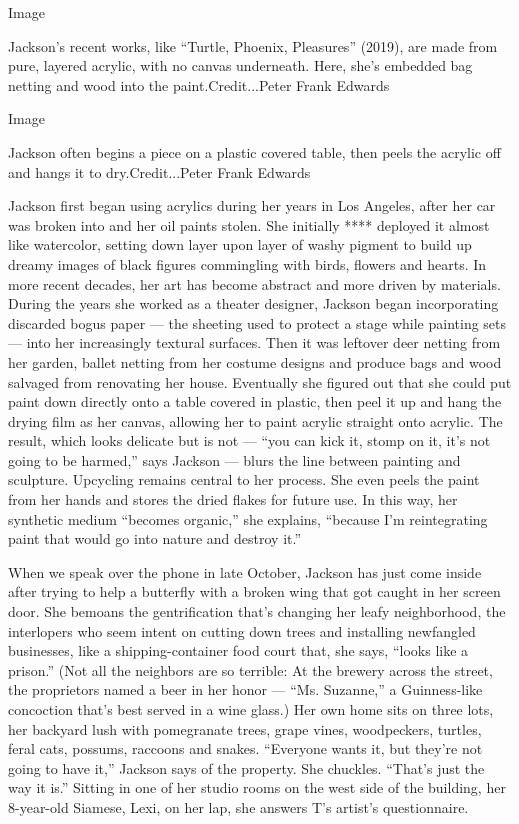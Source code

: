 Image

Jackson's recent works, like ``Turtle, Phoenix, Pleasures'' (2019), are
made from pure, layered acrylic, with no canvas underneath. Here, she's
embedded bag netting and wood into the paint.Credit...Peter Frank
Edwards

Image

Jackson often begins a piece on a plastic covered table, then peels the
acrylic off and hangs it to dry.Credit...Peter Frank Edwards

Jackson first began using acrylics during her years in Los Angeles,
after her car was broken into and her oil paints stolen. She initially
**** deployed it almost like watercolor, setting down layer upon layer
of washy pigment to build up dreamy images of black figures commingling
with birds, flowers and hearts. In more recent decades, her art has
become abstract and more driven by materials. During the years she
worked as a theater designer, Jackson began incorporating discarded
bogus paper --- the sheeting used to protect a stage while painting sets
--- into her increasingly textural surfaces. Then it was leftover deer
netting from her garden, ballet netting from her costume designs and
produce bags and wood salvaged from renovating her house. Eventually she
figured out that she could put paint down directly onto a table covered
in plastic, then peel it up and hang the drying film as her canvas,
allowing her to paint acrylic straight onto acrylic. The result, which
looks delicate but is not --- ``you can kick it, stomp on it, it's not
going to be harmed,'' says Jackson --- blurs the line between painting
and sculpture. Upcycling remains central to her process. She even peels
the paint from her hands and stores the dried flakes for future use. In
this way, her synthetic medium ``becomes organic,'' she explains,
``because I'm reintegrating paint that would go into nature and destroy
it.''

When we speak over the phone in late October, Jackson has just come
inside after trying to help a butterfly with a broken wing that got
caught in her screen door. She bemoans the gentrification that's
changing her leafy neighborhood, the interlopers who seem intent on
cutting down trees and installing newfangled businesses, like a
shipping-container food court that, she says, ``looks like a prison.''
(Not all the neighbors are so terrible: At the brewery across the
street, the proprietors named a beer in her honor --- ``Ms. Suzanne,'' a
Guinness-like concoction that's best served in a wine glass.) Her own
home sits on three lots, her backyard lush with pomegranate trees, grape
vines, woodpeckers, turtles, feral cats, possums, raccoons and snakes.
``Everyone wants it, but they're not going to have it,'' Jackson says of
the property. She chuckles. ``That's just the way it is.'' Sitting in
one of her studio rooms on the west side of the building, her 8-year-old
Siamese, Lexi, on her lap, she answers T's artist's questionnaire.

